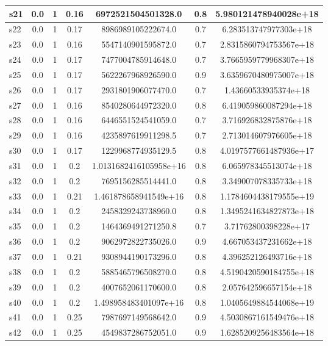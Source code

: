 \documentclass{article}
\begin{document}
\begin{tabular}{|l|c|c|c|c|c|c|}
\hline
s21 &0.0 & 1 & 0.16 & 6972521504501328.0 & 0.8 & 5.980121478940028e+18\\
\hline
s22 &0.0 & 1 & 0.17 & 8986989105222674.0 & 0.7 & 6.283513747977303e+18\\
\hline
s23 &0.0 & 1 & 0.16 & 5547140901595872.0 & 0.7 & 2.8315860794753567e+18\\
\hline
s24 &0.0 & 1 & 0.17 & 7477004785914648.0 & 0.7 & 3.7665959779968307e+18\\
\hline
s25 &0.0 & 1 & 0.17 & 5622267968926590.0 & 0.9 & 3.6359670480975007e+18\\
\hline
s26 &0.0 & 1 & 0.17 & 2931801906077470.0 & 0.7 & 1.43660533935374e+18\\
\hline
s27 &0.0 & 1 & 0.16 & 8540280644972320.0 & 0.8 & 6.419059860087294e+18\\
\hline
s28 &0.0 & 1 & 0.16 & 6446551524541059.0 & 0.7 & 3.716926832875876e+18\\
\hline
s29 &0.0 & 1 & 0.16 & 4235897619911298.5 & 0.7 & 2.713014607976605e+18\\
\hline
s30 &0.0 & 1 & 0.17 & 1229968774935129.5 & 0.8 & 4.0197577661487936e+17\\
\hline
s31 &0.0 & 1 & 0.2 & 1.0131682416105958e+16 & 0.8 & 6.065978345513074e+18\\
\hline
s32 &0.0 & 1 & 0.2 & 7695156285514441.0 & 0.8 & 3.349007078335733e+18\\
\hline
s33 &0.0 & 1 & 0.21 & 1.461878658941549e+16 & 0.8 & 1.1784604438179555e+19\\
\hline
s34 &0.0 & 1 & 0.2 & 2458329243738960.0 & 0.8 & 1.3495241634827873e+18\\
\hline
s35 &0.0 & 1 & 0.2 & 1464369491271250.8 & 0.7 & 3.71762800398228e+17\\
\hline
s36 &0.0 & 1 & 0.2 & 9062972822735026.0 & 0.9 & 4.667053437231662e+18\\
\hline
s37 &0.0 & 1 & 0.21 & 9308944190173296.0 & 0.8 & 4.396252126493716e+18\\
\hline
s38 &0.0 & 1 & 0.2 & 5885465796508270.0 & 0.8 & 4.5190420590184755e+18\\
\hline
s39 &0.0 & 1 & 0.2 & 4007652061170600.0 & 0.8 & 2.057642596657154e+18\\
\hline
s40 &0.0 & 1 & 0.2 & 1.498958483401097e+16 & 0.8 & 1.0405649884544068e+19\\
\hline
s41 &0.0 & 1 & 0.25 & 7987697149568642.0 & 0.9 & 4.5030867161549476e+18\\
\hline
s42 &0.0 & 1 & 0.25 & 4549837286752051.0 & 0.9 & 1.6285209256483564e+18\\

\end{tabular}
\end{document}
